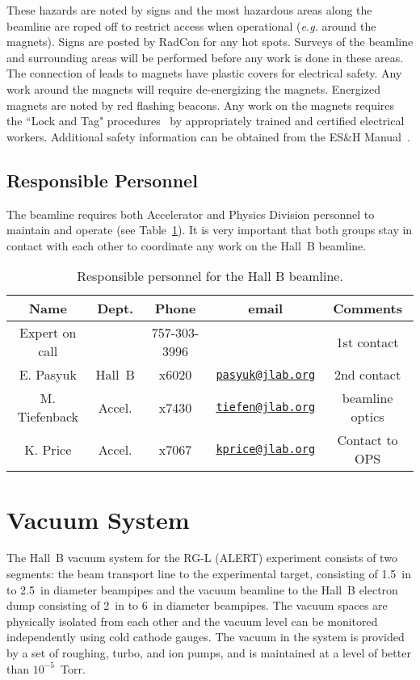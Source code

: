These hazards are noted by signs and the most hazardous areas along the beamline are 
roped off to restrict access when operational ({\it e.g.} around the magnets). Signs are posted 
by RadCon for any hot spots. Surveys of the beamline and surrounding areas will be 
performed before any work is done in these areas. The connection of leads to magnets have 
plastic covers for electrical safety. Any work around the magnets will require 
de-energizing the magnets. Energized magnets are noted by red flashing beacons. Any work 
on the magnets requires the ``Lock and Tag" procedures~\cite{esh} by appropriately trained
and certified electrical workers. Additional safety information can be obtained from the 
ES\&H Manual~\cite{esh}.

\subsection{Responsible Personnel}

The beamline requires both Accelerator and Physics Division personnel to maintain and 
operate (see Table~\ref{tb:beam}). It is very important that both groups stay in contact
with each other to coordinate any work on the Hall~B beamline. 

\begin{table}[!ht]
\centering
\begin{tabular}{|c|c|c|c|c|} \hline
Name&Dept.&Phone&email&Comments \\ \hline
Expert on call& &757-303-3996&& 1st contact \\ \hline
E. Pasyuk     & Hall~B&x6020&\href{mailto:pasyuk@jlab.org}{\nolinkurl{pasyuk@jlab.org}}&2nd contact \\ \hline
M. Tiefenback & Accel.&x7430&\href{mailto:tiefen@jlab.org}{\nolinkurl{tiefen@jlab.org}}& beamline optics\\ \hline
K. Price      & Accel.&x7067&\href{mailto:kprice@jlab.org}{\nolinkurl{kprice@jlab.org}}&Contact to OPS \\ \hline
\end{tabular}
\caption{Responsible personnel for the Hall B beamline.} 
\label{tb:beam}
\end{table}

\section{Vacuum System}

The Hall~B vacuum system for the RG-L (ALERT) experiment consists of two segments: the beam
transport line to the experimental target, consisting of 1.5~in to 2.5~in diameter
beampipes and the vacuum beamline to the Hall~B electron dump consisting of 
2~in to 6~in diameter beampipes. The vacuum spaces are physically isolated from each
other and the vacuum level can be monitored independently using cold cathode gauges. The
vacuum in the system is provided by a set of roughing, turbo, and ion pumps, and is
maintained at a level of better than $10^{-5}$~Torr. 

